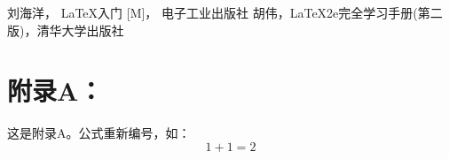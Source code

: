 \documentclass[a4paper,c5size,twoside,UTF8]{ctexart} %
\begin{document}
\begin{thebibliography}{1}
   刘海洋， \LaTeX 入门 [M]， 电子工业出版社
    胡伟，\LaTeX 2e完全学习手册(第二版)，清华大学出版社
\end{thebibliography}

		
\section*{附录A：}
\setcounter{equation}{0}
\renewcommand{\theequation}{A.\arabic{equation}}
这是附录A。公式重新编号，如：
\begin{equation}
	1+1=2
\end{equation}
\end{document}
